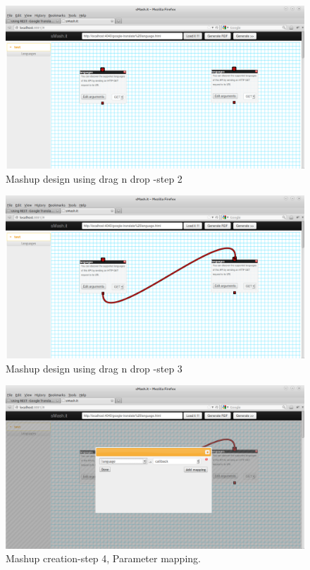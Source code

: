 \begin{figure}
        \centering
        \includegraphics[scale=0.3]{images/4.png}
        \caption{Mashup design using drag n drop -step 2}
\end{figure}


\begin{figure}
        \centering
        \includegraphics[scale=0.3]{images/3.png}
        \caption{Mashup design using drag n drop -step 3}
\end{figure}


\begin{figure}
        \centering
        \includegraphics[scale=0.3]{images/2.png}
        \caption{Mashup creation-step 4, Parameter mapping.}
\end{figure}

